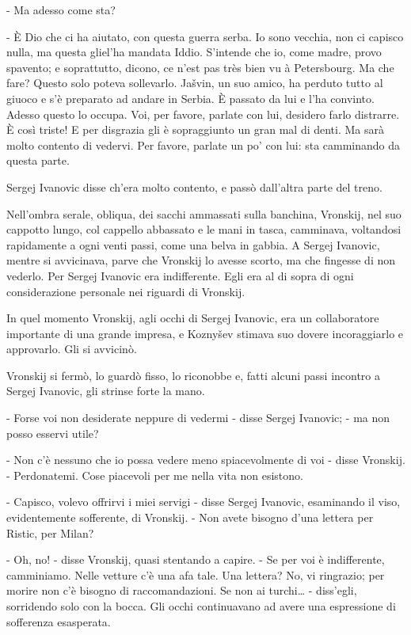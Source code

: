 - Ma adesso come sta? 

- È Dio che ci ha aiutato, con questa guerra serba. Io sono vecchia, non ci capisco nulla, ma questa gliel'ha mandata Iddio. S'intende che io, come madre, provo spavento; e soprattutto, dicono, ce n'est pas très bien vu à Petersbourg. Ma che fare? Questo solo poteva sollevarlo. Jašvin, un suo amico, ha perduto tutto al giuoco e s'è preparato ad andare in Serbia. È passato da lui e l'ha convinto. Adesso questo lo occupa. Voi, per favore, parlate con lui, desidero farlo distrarre. È così triste! E per disgrazia gli è sopraggiunto un gran mal di denti. Ma sarà molto contento di vedervi. Per favore, parlate un po' con lui: sta camminando da questa parte. 

Sergej Ivanovic disse ch'era molto contento, e passò dall'altra parte del treno. 

Nell'ombra serale, obliqua, dei sacchi ammassati sulla banchina, Vronskij, nel suo cappotto lungo, col cappello abbassato e le mani in tasca, camminava, voltandosi rapidamente a ogni venti passi, come una belva in gabbia. A Sergej Ivanovic, mentre si avvicinava, parve che Vronskij lo avesse scorto, ma che fingesse di non vederlo. Per Sergej Ivanovic era indifferente. Egli era al di sopra di ogni considerazione personale nei riguardi di Vronskij. 

In quel momento Vronskij, agli occhi di Sergej Ivanovic, era un collaboratore importante di una grande impresa, e Koznyšev stimava suo dovere incoraggiarlo e approvarlo. Gli si avvicinò. 

Vronskij si fermò, lo guardò fisso, lo riconobbe e, fatti alcuni passi incontro a Sergej Ivanovic, gli strinse forte la mano. 

- Forse voi non desiderate neppure di vedermi - disse Sergej Ivanovic; - ma non posso esservi utile? 

- Non c'è nessuno che io possa vedere meno spiacevolmente di voi - disse Vronskij. - Perdonatemi. Cose piacevoli per me nella vita non esistono. 

- Capisco, volevo offrirvi i miei servigi - disse Sergej Ivanovic, esaminando il viso, evidentemente sofferente, di Vronskij. - Non avete bisogno d'una lettera per Ristic, per Milan? 

- Oh, no! - disse Vronskij, quasi stentando a capire. - Se per voi è indifferente, camminiamo. Nelle vetture c'è una afa tale. Una lettera? No, vi ringrazio; per morire non c'è bisogno di raccomandazioni. Se non ai turchi\ldots{} - diss'egli, sorridendo solo con la bocca. Gli occhi continuavano ad avere una espressione di sofferenza esasperata. 

